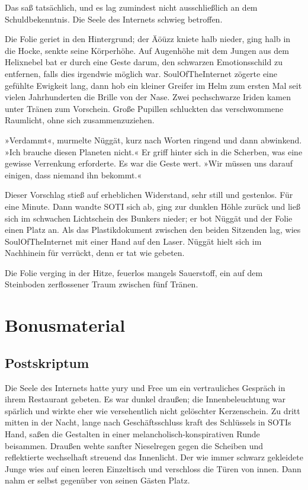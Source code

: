 Das saß tatsächlich, und es lag zumindest nicht ausschließlich an dem Schuldbekenntnis. Die Seele des Internets schwieg betroffen.

Die Folie geriet in den Hintergrund; der Äöüzz kniete halb nieder, ging halb in die Hocke, senkte seine Körperhöhe. Auf Augenhöhe mit dem Jungen aus dem Helixnebel bat er durch eine Geste darum, den schwarzen Emotionsschild zu entfernen, falls dies irgendwie möglich war. SoulOfTheInternet zögerte eine gefühlte Ewigkeit lang, dann hob ein kleiner Greifer im Helm zum ersten Mal seit vielen Jahrhunderten die Brille von der Nase. Zwei pechschwarze Iriden kamen unter Tränen zum Vorschein. Große Pupillen schluckten das verschwommene Raumlicht, ohne sich zusammenzuziehen.

»Verdammt«, murmelte Nüggät, kurz nach Worten ringend und dann abwinkend. »Ich brauche diesen Planeten nicht.« Er griff hinter sich in die Scherben, was eine gewisse Verrenkung erforderte. Es war die Geste wert. »Wir müssen uns darauf einigen, dass niemand ihn bekommt.«

Dieser Vorschlag stieß auf erheblichen Widerstand, sehr still und gestenlos. Für eine Minute. Dann wandte SOTI sich ab, ging zur dunklen Höhle zurück und ließ sich im schwachen Lichtschein des Bunkers nieder; er bot Nüggät und der Folie einen Platz an. Als das Plastikdokument zwischen den beiden Sitzenden lag, wies SoulOfTheInternet mit einer Hand auf den Laser. Nüggät hielt sich im Nachhinein für verrückt, denn er tat wie gebeten.

Die Folie verging in der Hitze, feuerlos mangels Sauerstoff, ein auf dem Steinboden zerflossener Traum zwischen fünf Tränen.



\part{Bonusmaterial}

\chapter{Postskriptum}

Die Seele des Internets hatte yury und Free um ein vertrauliches Gespräch in ihrem Restaurant gebeten. Es war dunkel draußen; die Innenbeleuchtung war spärlich und wirkte eher wie versehentlich nicht gelöschter Kerzenschein.  Zu dritt mitten in der Nacht, lange nach Geschäftsschluss kraft des Schlüssels in SOTIs Hand, saßen die Gestalten in einer melancholisch-konspirativen Runde beisammen. Draußen wehte sanfter Nieselregen gegen die Scheiben und reflektierte wechselhaft streuend das Innenlicht. Der wie immer schwarz gekleidete Junge wies auf einen leeren Einzeltisch und verschloss die Türen von innen. Dann nahm er selbst gegenüber von seinen Gästen Platz.

